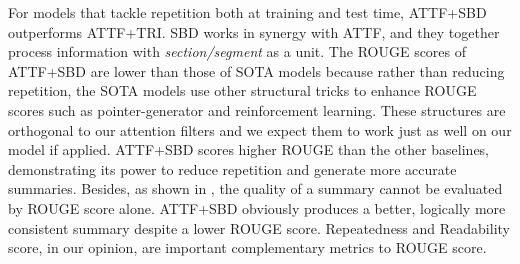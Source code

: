 For models that tackle repetition both at training and test time, 
ATTF+SBD outperforms ATTF+TRI.
SBD works in synergy with ATTF, and they together process 
information with \textit{section/segment} as a unit.
The ROUGE scores of ATTF+SBD are lower than
those of SOTA models 
because rather than reducing repetition, the SOTA models use 
other structural tricks to enhance ROUGE scores 
such as pointer-generator and reinforcement learning.
These structures are orthogonal 
to our attention filters
and we expect them to work just as well on our model if applied.
ATTF+SBD scores higher ROUGE than the other baselines, 
demonstrating its power to  reduce 
repetition and generate more accurate summaries.
Besides, as shown in , the quality of a summary cannot be evaluated by
ROUGE score alone.
ATTF+SBD obviously produces a better, logically more consistent summary despite 
a lower ROUGE score.  Repeatedness and Readability score, 
in our opinion, are important complementary metrics to ROUGE score.  


